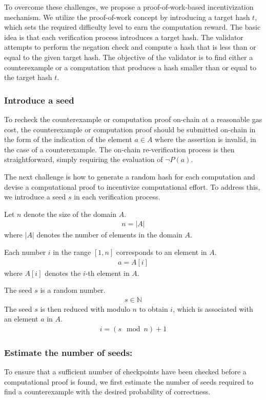 \documentclass[runningheads]{llncs}
\begin{document}
To overcome these challenges, we propose a proof-of-work-based incentivization mechanism. We utilize the proof-of-work concept by introducing a target hash \( t \), which sets the required difficulty level to earn the computation reward. The basic idea is that each verification process introduces a target hash. The validator attempts to perform the negation check and compute a hash that is less than or equal to the given target hash. The objective of the validator is to find either a counterexample or a computation that produces a hash smaller than or equal to the target hash \( t \).
\subsubsection{Introduce a seed} To recheck the counterexample or computation proof on-chain at a reasonable gas cost, the counterexample or computation proof should be submitted on-chain in the form of the indication of the element \( a \in A \) where the assertion is invalid, in the case of a counterexample. The on-chain re-verification process is then straightforward, simply requiring the evaluation of \( \neg P(a) \).

The next challenge is how to generate a random hash for each computation and devise a computational proof to incentivize computational effort. To address this, we introduce a seed \( s \) in each verification process.

Let \( n \) denote the size of the domain \( A \). 
\begin{gather*}
n = |A|
\end{gather*}
where \(|A| \) denotes the number of elements in the domain $A$.

Each number \( i \) in the range \([1, n]\) corresponds to an element in \( A \). 
\begin{gather*}
a=A[i]
\end{gather*}
where $A[i]$ denotes the $i$-th element in $A$.

The seed \( s \) is a random number. 
\begin{gather*}
s \in \mathbb{N} 
\end{gather*}
The seed $s$  is then reduced with modulo \( n \) to obtain \( i \), which is associated with an element \( a \) in \( A \).
\begin{gather}
\label{eq:11}
i = (s\mod n) + 1
\end{gather}
\subsubsection{Estimate the number of seeds:} To ensure that a sufficient number of checkpoints have been checked before a computational proof is found, we first estimate the number of seeds required to find a counterexample with the desired probability of correctness.
\end{document}
